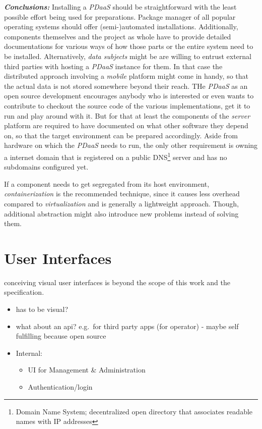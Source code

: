 \documentclass[12pt,english,a4paper,titlepage,cleardoublepage=empty,dottedtoc]{report}
\providecommand{\tightlist}{%
  \setlength{\itemsep}{0pt}\setlength{\parskip}{0pt}}
\begin{document}
\emph{\textbf{Conclusions:}} Installing a \emph{PDaaS} should be
straightforward with the least possible effort being used for
preparations. Package manager of all popular operating systems should
offer (semi-)automated installations. Additionally, components
themselves and the project as whole have to provide detailed
documentations for various ways of how those parts or the entire system
need to be installed. Alternatively, \emph{data subjects} might be are
willing to entrust external third parties with hosting a \emph{PDaaS}
instance for them. In that case the distributed approach involving a
\emph{mobile} platform might come in handy, so that the actual data is
not stored somewhere beyond their reach. THe \emph{PDaaS} as an open
source development encourages anybody who is interested or even wants to
contribute to checkout the source code of the various implementations,
get it to run and play around with it. But for that at least the
components of the \emph{server} platform are required to have documented
on what other software they depend on, so that the target environment
can be prepared accordingly. Aside from hardware on which the
\emph{PDaaS} needs to run, the only other requirement is owning a
internet domain that is registered on a public DNS\footnote{Domain Name
  System; decentralized open directory that associates readable names
  with IP addresses} server and has no subdomains configured yet.

If a component needs to get segregated from its host environment,
\emph{containerization} is the recommended technique, since it causes
less overhead compared to \emph{virtualization} and is generally a
lightweight approach. Though, additional abstraction might also
introduce new problems instead of solving them.

\section{User Interfaces}\label{user-interfaces}

conceiving visual user interfaces is beyond the scope of this work and
the specification.

\begin{itemize}
\tightlist
\item
  has to be visual?
\item
  what about an api? e.g.~for third party apps (for operator) - maybe
  self fulfilling because open source
\item
  Internal:

  \begin{itemize}
  \tightlist
  \item
    UI for Management \& Administration
  \item
    Authentication/login
  \end{itemize}
\end{itemize}
\end{document}
